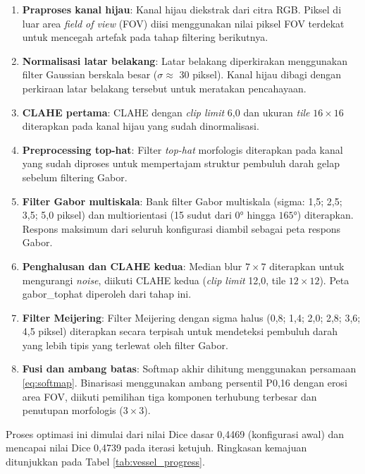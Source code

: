 \begin{enumerate}
    \item \textbf{Praproses kanal hijau}: Kanal hijau diekstrak dari citra RGB. Piksel di
    luar area \textit{field of view} (FOV) diisi menggunakan nilai piksel FOV terdekat untuk
    mencegah artefak pada tahap filtering berikutnya.
    \item \textbf{Normalisasi latar belakang}: Latar belakang diperkirakan menggunakan filter
    Gaussian berskala besar ($\sigma \approx$ 30 piksel). Kanal hijau dibagi dengan perkiraan
    latar belakang tersebut untuk meratakan pencahayaan.
    \item \textbf{CLAHE pertama}: CLAHE dengan \textit{clip limit} 6,0 dan ukuran \textit{tile}
    $16 \times 16$ diterapkan pada kanal hijau yang sudah dinormalisasi.
    \item \textbf{Preprocessing top-hat}: Filter \textit{top-hat} morfologis diterapkan pada
    kanal yang sudah diproses untuk mempertajam struktur pembuluh darah gelap sebelum filtering
    Gabor.
    \item \textbf{Filter Gabor multiskala}: Bank filter Gabor multiskala (sigma: 1,5; 2,5; 3,5;
    5,0 piksel) dan multiorientasi (15 sudut dari $0°$ hingga $165°$) diterapkan. Respons
    maksimum dari seluruh konfigurasi diambil sebagai peta respons Gabor.
    \item \textbf{Penghalusan dan CLAHE kedua}: Median blur $7 \times 7$ diterapkan untuk
    mengurangi \textit{noise}, diikuti CLAHE kedua (\textit{clip limit} 12,0, tile $12 \times 12$).
    Peta gabor\_tophat diperoleh dari tahap ini.
    \item \textbf{Filter Meijering}: Filter Meijering dengan sigma halus (0,8; 1,4; 2,0; 2,8;
    3,6; 4,5 piksel) diterapkan secara terpisah untuk mendeteksi pembuluh darah yang lebih tipis
    yang terlewat oleh filter Gabor.
    \item \textbf{Fusi dan ambang batas}: Softmap akhir dihitung menggunakan persamaan
    \ref{eq:softmap}. Binarisasi menggunakan ambang persentil P0,16 dengan erosi area FOV,
    diikuti pemilihan tiga komponen terhubung terbesar dan penutupan morfologis ($3 \times 3$).
\end{enumerate}

Proses optimasi ini dimulai dari nilai Dice dasar 0,4469 (konfigurasi awal) dan mencapai
nilai Dice 0,4739 pada iterasi ketujuh. Ringkasan kemajuan ditunjukkan pada Tabel
\ref{tab:vessel_progress}.

